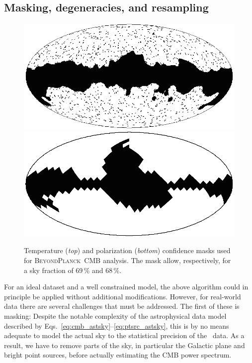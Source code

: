 \documentclass[twocolumn]{aa}
\newcommand{\BP}{\textsc{BeyondPlanck}}
\begin{document}
\subsection{Masking, degeneracies, and resampling}
\label{sec:resampling}

\begin{figure}[t]
  \center
  \includegraphics[width=\linewidth]{figs/BP10_Tmask.png}\\
  \includegraphics[width=\linewidth]{figs/BP10_Pmask.png}
  \caption{Temperature (\emph{top}) and polarization (\emph{bottom}) confidence
    masks used for \BP\ CMB analysis. The mask allow, respectively, for 
    a sky fraction of 69\,\% and 68\,\%.}
  \label{fig:confmasks}
\end{figure}


For an ideal dataset and a well constrained model, the above algorithm
could in principle be applied without additional
modifications. However, for real-world data there are several
challenges that must be addressed. The first of these is masking:
Despite the notable complexity of the astrophysical data model
described by Eqs.~\eqref{eq:cmb_astsky}--\eqref{eq:ptsrc_astsky}, this
is by no means adequate to model the actual sky to the statistical
precision of the \Planck\ data. As a result, we have to remove parts
of the sky, in particular the Galactic plane and bright point sources,
before actually estimating the CMB power spectrum.
\end{document}
